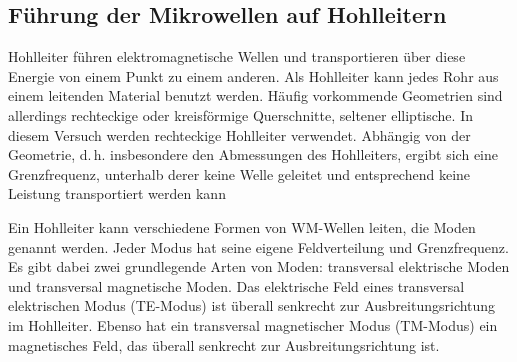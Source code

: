 \subsection{Führung der Mikrowellen auf Hohlleitern}

Hohlleiter führen elektromagnetische Wellen und transportieren über
diese Energie von einem Punkt zu einem anderen.  Als Hohlleiter kann
jedes Rohr aus einem leitenden Material benutzt werden.  Häufig
vorkommende Geometrien sind allerdings rechteckige oder kreisförmige
Querschnitte, seltener elliptische.  In diesem Versuch werden
rechteckige Hohlleiter verwendet.  Abhängig von der Geometrie,
d.\,h. insbesondere den Abmessungen des Hohlleiters, ergibt sich eine
Grenzfrequenz, unterhalb derer keine Welle geleitet und entsprechend
keine Leistung transportiert werden kann 

Ein Hohlleiter kann verschiedene Formen von WM-Wellen leiten, die Moden
genannt werden. Jeder Modus hat seine eigene Feldverteilung und
Grenzfrequenz. Es gibt dabei zwei grundlegende Arten von Moden:
transversal elektrische Moden und transversal magnetische Moden.  Das
elektrische Feld eines transversal elektrischen Modus (TE-Modus) ist
überall senkrecht zur Ausbreitungsrichtung im Hohlleiter.  Ebenso hat
ein transversal magnetischer Modus (TM-Modus) ein magnetisches Feld, das
überall senkrecht zur Ausbreitungsrichtung ist.


